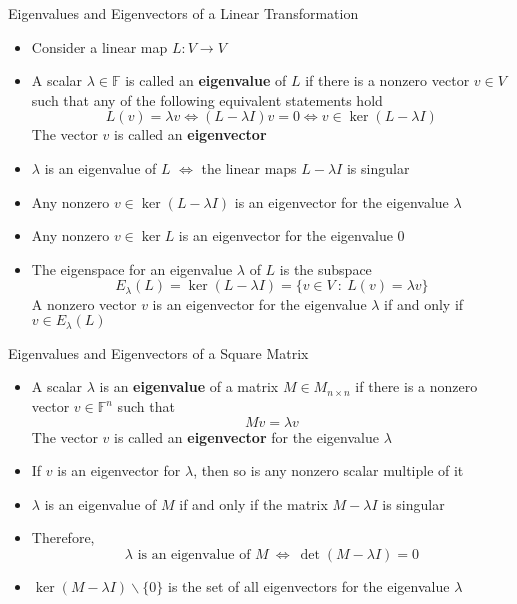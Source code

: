 \documentclass[usenames,dvipsnames,10pt]{beamer}
\newcommand\F{\mathbb{F}}
\begin{document}
\begin{frame}
  {Eigenvalues and Eigenvectors of a Linear Transformation}

  \begin{itemize}
  \item Consider a linear map $L: V \rightarrow V$
  \item A scalar $\lambda \in \F$ is called an {\bf eigenvalue} of $L$ if there is a nonzero vector $v \in V$ such that any of the following equivalent statements hold
    \[
      L(v) = \lambda v \iff (L-\lambda I)v = 0 \iff v \in \ker (L-\lambda I)
    \]
    The vector $v$ is called an {\bf eigenvector}
  \item $\lambda$ is an eigenvalue of $L$ $\iff$ the linear maps $L - \lambda I$ is singular
  \item Any nonzero $v \in \ker (L-\lambda I)$ is an eigenvector for the eigenvalue $\lambda$
  \item Any nonzero $v \in \ker L$ is an eigenvector for the eigenvalue $0$
  \item The eigenspace for an eigenvalue $\lambda$ of $L$ is the subspace
    \[
      E_\lambda(L) = \ker (L-\lambda I) = \{ v \in V\ :\ L(v) = \lambda v \}
    \]
    A nonzero vector $v$ is an eigenvector for the eigenvalue $\lambda$ if and only if $v \in E_\lambda(L)$
  \end{itemize}
\end{frame}

\begin{frame}
  {Eigenvalues and Eigenvectors of a Square Matrix}

  \begin{itemize}
  \item A scalar $\lambda$ is an {\bf eigenvalue} of a matrix $M \in M_{n\times n}$ if there is a nonzero vector $v \in \F^n$ such that
    \[
      Mv = \lambda v
    \]
    The vector $v$ is called an {\bf eigenvector} for the eigenvalue $\lambda$
  \item If $v$ is an eigenvector for $\lambda$, then so is any nonzero scalar multiple of it
  \item $\lambda$ is an eigenvalue of $M$ if and only if the matrix $M - \lambda I$ is singular
  \item Therefore,
    \[
      \lambda\text{ is an eigenvalue of }M\ \iff\ \det (M-\lambda I) = 0
    \]
  \item $\ker(M-\lambda I)\backslash\{0\}$ is the set of all eigenvectors for the eigenvalue $\lambda$
  \end{itemize}
\end{frame}
\end{document}
